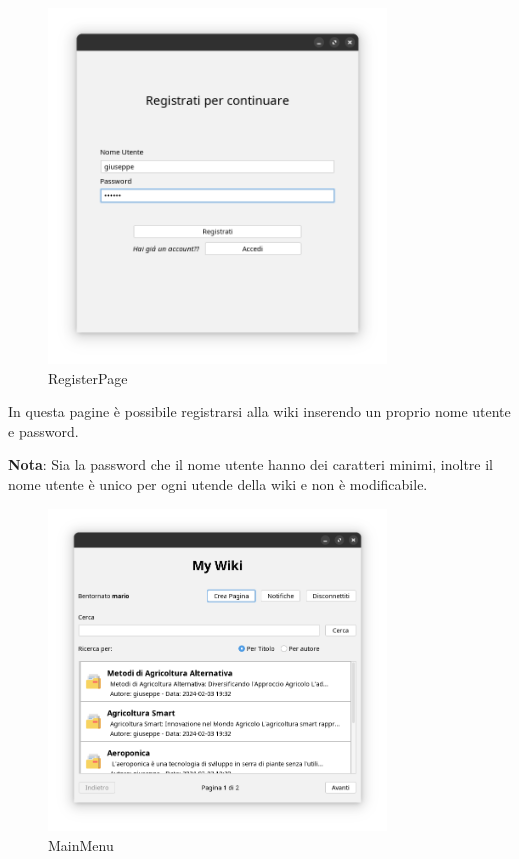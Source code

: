 \documentclass{article}
\begin{document}
	\begin{figure}[htbp]
		\centering
		\includegraphics[width=0.8\textwidth,height=0.8\textheight,keepaspectratio]{register_page.png}
		\caption{RegisterPage}
		\label{fig:2}
	\end{figure}
	
	In questa pagine \`e possibile registrarsi alla wiki inserendo un proprio nome utente e password.
	
	\textbf{Nota}: Sia la password che il nome utente hanno dei caratteri minimi, inoltre il nome utente \`e unico per ogni utende della wiki e non \`e modificabile.
	
	\newpage
	
	\begin{figure}[htbp]
		\centering
		\includegraphics[width=0.8\textwidth,height=0.8\textheight,keepaspectratio]{ main_menu.png}
		\caption{MainMenu}
		\label{fig:3}
	\end{figure}
	
\end{document}
